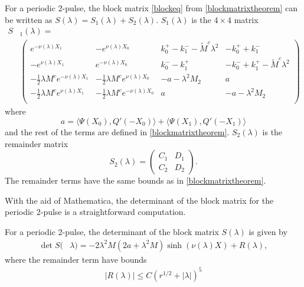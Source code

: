 \documentclass[thesis.tex]{subfiles}
\begin{document}
\begin{corollary}\label{corr:2blockmatrix}
For a periodic 2-pulse, the block matrix \cref{blockeq} from \cref{blockmatrixtheorem} can be written as $S(\lambda) = S_1(\lambda) + S_2(\lambda)$. $S_1(\lambda)$ is the $4 \times 4$ matrix
\begin{align}
S&_1(\lambda) = \\
&\begin{pmatrix}
e^{-\nu(\lambda)X_1} & -e^{\nu(\lambda)X_0} & k_0^+ - k_1^- -\tilde{M}^c \lambda^2 & -k_0^+ + k_1^- \\
-e^{\nu(\lambda)X_1} & e^{-\nu(\lambda)X_0} & k_0^- - k_1^+ & -k_0^- + k_1^+-\tilde{M}^c \lambda^2 \\
-\frac{1}{2}\lambda M^c e^{-\nu(\lambda)X_1} & -\frac{1}{2}\lambda M^ce^{\nu(\lambda)X_0} &-a-\lambda^2 M_2 & a \\
-\frac{1}{2}\lambda M^c e^{\nu(\lambda)X_1} & -\frac{1}{2}\lambda M^c e^{-\nu(\lambda)X_0}  & a & -a-\lambda^2 M_2 \\
\end{pmatrix}
\end{align}
where
\begin{equation}\label{2pa}
a = \langle \Psi(X_0), Q'(-X_0) \rangle + \langle \Psi(X_1), Q'(-X_1) \rangle
\end{equation}
and the rest of the terms are defined in \cref{blockmatrixtheorem}. $S_2(\lambda)$ is the remainder matrix
\[
S_2(\lambda) = \begin{pmatrix} C_1 & D_1 \\ C_2 & D_2 \end{pmatrix}.
\]
The remainder terms have the same bounds as in \cref{blockmatrixtheorem}.
\end{corollary}

With the aid of Mathematica, the determinant of the block matrix for the periodic 2-pulse is a straightforward computation.

\begin{corollary}\label{corr:2perDet1}
For a periodic 2-pulse, the determinant of the block matrix $S(\lambda)$ is given by
\begin{equation*}
\begin{aligned}
\det S(&\lambda) = -2 \lambda^2 M (2a + \lambda^2 M) \sinh(\nu(\lambda)X) + R(\lambda),
\end{aligned}
\end{equation*}
where the remainder term have bounds
\begin{align*}
|R(\lambda)| \leq C(r^{1/2} + |\lambda|)^5
\end{align*}
\end{corollary}
\end{document}
